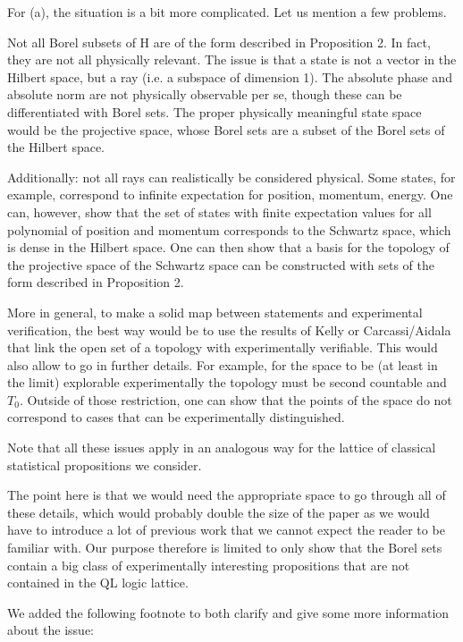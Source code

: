 \documentclass[11pt]{article}
\begin{document}
For (a), the situation is a bit more complicated. Let us mention a few problems.

Not all Borel subsets of H are of the form described in Proposition 2. In fact, they are not all physically relevant. The issue is that a state is not a vector in the Hilbert space, but a ray (i.e. a subspace of dimension 1). The absolute phase and absolute norm are not physically observable per se, though these can be differentiated with Borel sets. The proper physically meaningful state space would be the projective space, whose Borel sets are a subset of the Borel sets of the Hilbert space.

Additionally: not all rays can realistically be considered physical. Some states, for example, correspond to infinite expectation for position, momentum, energy. One can, however, show that the set of states with finite expectation values for all polynomial of position and momentum corresponds to the Schwartz space, which is dense in the Hilbert space. One can then show that a basis for the topology of the projective space of the Schwartz space can be constructed with sets of the form described in Proposition 2.

More in general, to make a solid map between statements and experimental verification, the best way would be to use the results of Kelly or Carcassi/Aidala that link the open set of a topology with experimentally verifiable. This would also allow to go in further details. For example, for the space to be (at least in the limit) explorable experimentally the topology must be second countable and $T_0$. Outside of those restriction, one can show that the points of the space do not correspond to cases that can be experimentally distinguished.

Note that all these issues apply in an analogous way for the lattice of classical statistical propositions we consider.

The point here is that we would need the appropriate space to go through all of these details, which would probably double the size of the paper as we would have to introduce a lot of previous work that we cannot expect the reader to be familiar with. Our purpose therefore is limited to only show that the Borel sets contain a big class of experimentally interesting propositions that are not contained in the QL logic lattice.

We added the following footnote to both clarify and give some more information about the issue:
\end{document}
